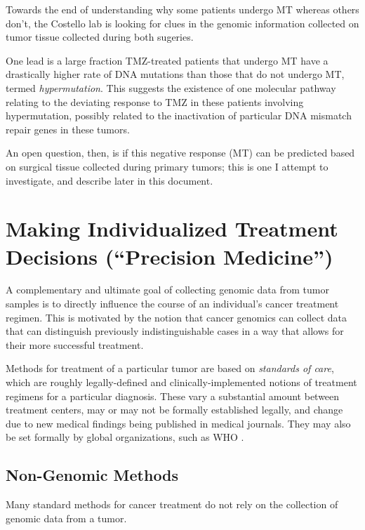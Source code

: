        Towards the end of understanding why some patients undergo MT
       whereas others don't, the Costello lab is looking for clues in
       the genomic information collected on tumor tissue collected
       during both sugeries.

       One lead is a large fraction TMZ-treated patients that undergo MT 
       have a drastically higher rate of DNA mutations than those that
       do not undergo MT, termed \textit{hypermutation}. This suggests
       the existence of one molecular pathway relating to the
       deviating response to TMZ in these patients involving
       hypermutation, possibly related to the inactivation of
       particular DNA mismatch repair genes in these tumors.

       An open question, then, is if this negative response (MT) can
       be predicted based on surgical tissue collected during primary
       tumors; this is one I attempt to investigate, and describe
       later in this document.

       \section{Making Individualized Treatment Decisions (``Precision
         Medicine'')}

       A complementary and ultimate goal of collecting genomic data
       from tumor samples is to directly influence the course of an
       individual's cancer treatment regimen. This is motivated by the
       notion that cancer genomics can collect data that can
       distinguish previously indistinguishable cases in a way that
       allows for their more successful treatment.

    Methods for treatment of a particular tumor are based
       on \textit{standards of care}, which are roughly
       legally-defined and clinically-implemented notions of treatment
      regimens for a particular diagnosis. These vary a substantial
      amount between treatment centers, may or may not be formally
      established legally, and change due to new medical findings
      being published in medical journals. They may also be set
      formally by global organizations, such as WHO
      \cite{moffett_standard_2011}.       

       \subsection{Non-Genomic Methods}
      Many standard methods for cancer treatment do not rely on the
      collection of genomic data from a tumor.
      
